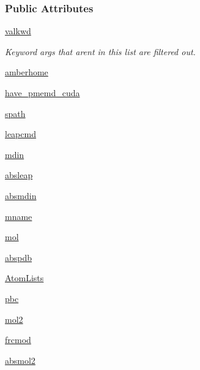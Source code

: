 \subsubsection*{Public Attributes}
\begin{DoxyCompactItemize}
\item 
\hyperlink{classsrc_1_1amberio_1_1AMBER_a411fdc3f6b0124021a79e3462a16a308}{valkwd}
\begin{DoxyCompactList}\small\item\em Keyword args that aren\textquotesingle{}t in this list are filtered out. \end{DoxyCompactList}\item 
\hyperlink{classsrc_1_1amberio_1_1AMBER_aedf94e9d30f478ddb2e6751a62700864}{amberhome}
\item 
\hyperlink{classsrc_1_1amberio_1_1AMBER_a82af4dfb560d3ec29435a601ef3f3224}{have\+\_\+pmemd\+\_\+cuda}
\item 
\hyperlink{classsrc_1_1amberio_1_1AMBER_a88fbca717ef71fce9b2c77edfe2c68c2}{spath}
\item 
\hyperlink{classsrc_1_1amberio_1_1AMBER_a6217910dccd41b6d63b1c3c114ab8621}{leapcmd}
\item 
\hyperlink{classsrc_1_1amberio_1_1AMBER_aef12e74e4e6d5939b5107dd6e74907f6}{mdin}
\item 
\hyperlink{classsrc_1_1amberio_1_1AMBER_a44d0917803f3f77fddbcde1ebe107f9e}{absleap}
\item 
\hyperlink{classsrc_1_1amberio_1_1AMBER_a29bf1d4ca3af2ef18f6a697ab33ac345}{absmdin}
\item 
\hyperlink{classsrc_1_1amberio_1_1AMBER_a3d4513742ce30e7b7d79e2e309308add}{mname}
\item 
\hyperlink{classsrc_1_1amberio_1_1AMBER_a77ac445727cac52d979a47be2ca1c631}{mol}
\item 
\hyperlink{classsrc_1_1amberio_1_1AMBER_acadf27ac38535422b107653050702c8c}{abspdb}
\item 
\hyperlink{classsrc_1_1amberio_1_1AMBER_abadb419e20cba244751168104f3074f4}{Atom\+Lists}
\item 
\hyperlink{classsrc_1_1amberio_1_1AMBER_a7ec48c73aad9abedc968cdd627fde680}{pbc}
\item 
\hyperlink{classsrc_1_1amberio_1_1AMBER_a3ee3ba8a6d17157797bc023b8e1f7597}{mol2}
\item 
\hyperlink{classsrc_1_1amberio_1_1AMBER_a544a3fd7955991d698aec937759f6977}{frcmod}
\item 
\hyperlink{classsrc_1_1amberio_1_1AMBER_a679773e12ab5d968cc77a55e6c6d9cfd}{absmol2}

\end{DoxyCompactItemize}
